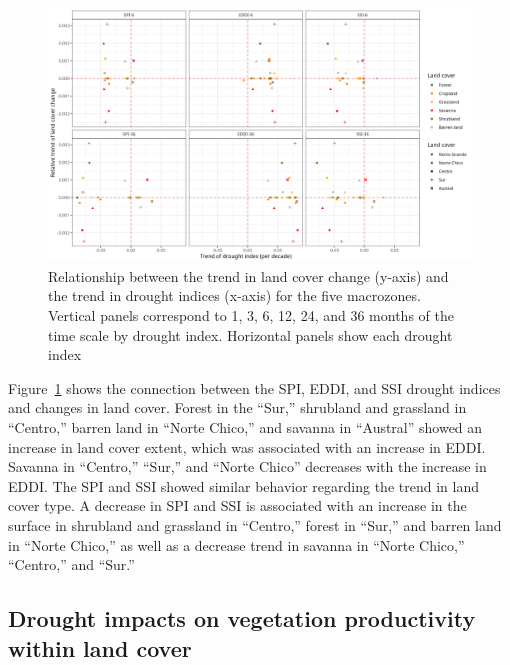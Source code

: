 \documentclass[
  authoryear,
  preprint,
  3p,
  onecolumn]{elsarticle}
\begin{document}
\begin{figure}[!ht]

{\centering \includegraphics{../output/figs/points_landcover_drought_indices_trend_and_time_scale.png}

}

\caption{\label{fig-TrendsLandDrought}Relationship between the trend in
land cover change (y-axis) and the trend in drought indices (x-axis) for
the five macrozones. Vertical panels correspond to 1, 3, 6, 12, 24, and
36 months of the time scale by drought index. Horizontal panels show
each drought index}

\end{figure}

Figure~\ref{fig-TrendsLandDrought} shows the connection between the SPI,
EDDI, and SSI drought indices and changes in land cover. Forest in the
``Sur,'' shrubland and grassland in ``Centro,'' barren land in ``Norte
Chico,'' and savanna in ``Austral'' showed an increase in land cover
extent, which was associated with an increase in EDDI. Savanna in
``Centro,'' ``Sur,'' and ``Norte Chico'' decreases with the increase in
EDDI. The SPI and SSI showed similar behavior regarding the trend in
land cover type. A decrease in SPI and SSI is associated with an
increase in the surface in shrubland and grassland in ``Centro,'' forest
in ``Sur,'' and barren land in ``Norte Chico,'' as well as a decrease
trend in savanna in ``Norte Chico,'' ``Centro,'' and ``Sur.''

\hypertarget{drought-impacts-on-vegetation-productivity-within-land-cover}{%
\subsection{Drought impacts on vegetation productivity within land
cover}\label{drought-impacts-on-vegetation-productivity-within-land-cover}}
\end{document}
